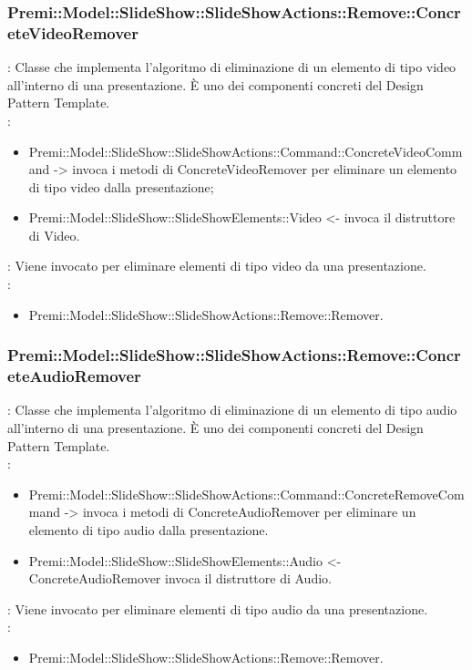 {            \subsubsection{Premi::Model::SlideShow::SlideShowActions::Remove::ConcreteVideoRemover}{
				\textbf{\tipo}: Classe che implementa l'algoritmo di eliminazione di un elemento di tipo video all’interno di una presentazione.
È uno dei componenti concreti del Design Pattern Template.\\	
				\textbf{\relaz}: 
				\begin{itemize}
					\item Premi::Model::SlideShow::SlideShowActions::Command::ConcreteVideoCommand -> invoca i metodi di ConcreteVideoRemover per eliminare un elemento di tipo video dalla presentazione;
                    \item Premi::Model::SlideShow::SlideShowElements::Video <- invoca il distruttore di Video.
				\end{itemize} 
				\textbf{\interfacce}: Viene invocato per eliminare elementi di tipo video da una presentazione.\\
                \textbf{\base}: 
                    \begin{itemize}
                    \item Premi::Model::SlideShow::SlideShowActions::Remove::Remover.
                    \end{itemize}
			}
            \subsubsection{Premi::Model::SlideShow::SlideShowActions::Remove::ConcreteAudioRemover}{
				\textbf{\tipo}: Classe che implementa l'algoritmo di eliminazione di un elemento di tipo audio all’interno di una presentazione.
È uno dei componenti concreti del Design Pattern Template.\\	
				\textbf{\relaz}: 
				\begin{itemize}
					\item Premi::Model::SlideShow::SlideShowActions::Command::ConcreteRemoveCommand -> invoca i metodi di ConcreteAudioRemover per eliminare un elemento di tipo audio dalla presentazione.
                    \item Premi::Model::SlideShow::SlideShowElements::Audio <- ConcreteAudioRemover invoca il distruttore di Audio.
				\end{itemize} 
				\textbf{\interfacce}: Viene invocato per eliminare elementi di tipo audio da una presentazione.\\
                \textbf{\base}: 
                    \begin{itemize}
                    \item Premi::Model::SlideShow::SlideShowActions::Remove::Remover.
                    \end{itemize}
			}
}
